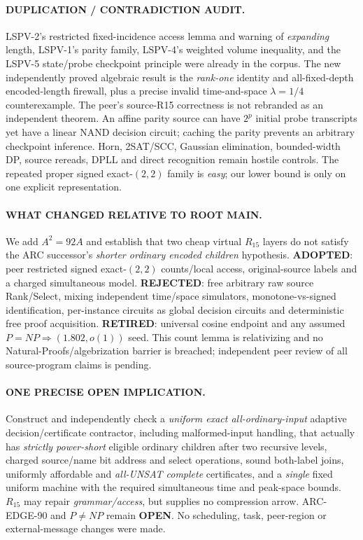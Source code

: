 \documentclass[11pt]{article}
\begin{document}
\paragraph{DUPLICATION / CONTRADICTION AUDIT.}
LSPV-2's restricted fixed-incidence access lemma and warning of
\emph{expanding} length, LSPV-1's parity family,
LSPV-4's weighted volume inequality, and the LSPV-5 state/probe
checkpoint principle were already in the corpus. The new independently
proved algebraic result is the \emph{rank-one} identity and
all-fixed-depth encoded-length firewall, plus a precise invalid
time-and-space $\lambda=1/4$ counterexample. The peer's source-R15
correctness is not rebranded as an independent theorem.
An affine parity source can have $2^p$ initial probe transcripts
yet have a linear NAND decision circuit; caching the parity prevents
an arbitrary checkpoint inference. Horn, 2SAT/SCC, Gaussian elimination,
bounded-width DP, source rereads, DPLL and direct recognition remain
hostile controls. The repeated proper signed exact-$(2,2)$ family is
\emph{easy}; our lower bound is only on one explicit representation.

\paragraph{WHAT CHANGED RELATIVE TO ROOT MAIN.}
We add $A^2=92A$ and establish that two cheap virtual $R_{15}$
layers do not satisfy the ARC successor's \emph{shorter ordinary
encoded children} hypothesis. \textbf{ADOPTED}: peer restricted
signed exact-$(2,2)$ counts/local access, original-source labels and
a charged simultaneous model. \textbf{REJECTED}: free arbitrary raw
source Rank/Select, mixing independent time/space simulators,
monotone-vs-signed identification, per-instance circuits as global
decision circuits and deterministic free proof acquisition.
\textbf{RETIRED}: universal cosine endpoint and any assumed
$P=NP\Rightarrow(1.802,o(1))$ seed. This count lemma is
relativizing and no Natural-Proofs/algebrization barrier is breached;
independent peer review of all source-program claims is pending.

\paragraph{ONE PRECISE OPEN IMPLICATION.}
Construct and independently check a \emph{uniform exact all-ordinary-input}
adaptive decision/certificate contractor, including malformed-input
handling, that actually has \emph{strictly power-short} eligible ordinary
children after two recursive levels, charged source/name bit address
and select operations, sound both-label joins, uniformly affordable
and \emph{all-UNSAT complete} certificates, and a \emph{single} fixed
uniform machine with the required simultaneous time and peak-space
bounds. $R_{15}$ may repair \emph{grammar/access}, but supplies no
compression arrow. ARC-EDGE-90 and $P\ne NP$ remain \textbf{OPEN}.
No scheduling, task, peer-region or external-message changes were made.
\end{document}

